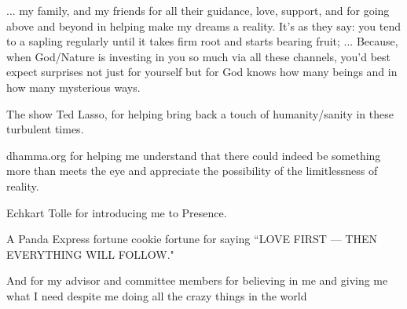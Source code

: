 ... my family, and my friends for all their guidance, love, support, and for going above and beyond in helping make my dreams a reality. It's as they say: you tend to a sapling regularly until it takes firm root and starts bearing fruit; ... Because, when God/Nature is investing in you so much via all these channels, you'd best expect surprises not just for yourself but for God knows how many beings and in how many mysterious ways.

The show Ted Lasso, for helping bring back a touch of humanity/sanity in these turbulent times.

dhamma.org for helping me understand that there could indeed be something more than meets the eye and appreciate the possibility of the limitlessness of reality.

Echkart Tolle for introducing me to Presence.

A Panda Express fortune cookie fortune for saying ``LOVE FIRST --- THEN EVERYTHING WILL FOLLOW."

And for my advisor and committee members for believing in me and giving me what I need despite me doing all the crazy things in the world